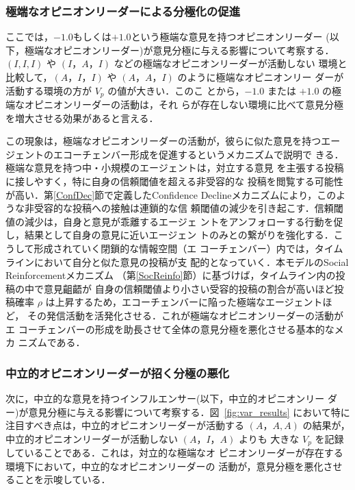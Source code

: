 \documentclass[a4j]{ujarticle}
\def\post{\rho} %
\def\postOpVar{V_p}
\begin{document}
\subsubsection{極端なオピニオンリーダーによる分極化の促進}
ここでは，$-1.0$もしくは$+1.0$という極端な意見を持つオピニオンリーダー
(以下，極端なオピニオンリーダー)が意見分極に与える影響について考察する．
$(I,I,I)$ や $(I，A，I)$ などの極端なオピニオンリーダーが活動しない
環境と比較して，$(A，I，I)$ や $(A，A，I)$ のように極端なオピニオンリー
ダーが活動する環境の方が $\postOpVar$ の値が大きい．このこ
とから，$-1.0$ または $+1.0$ の極端なオピニオンリーダーの活動は，それ
らが存在しない環境に比べて意見分極を増大させる効果があると言える．
\par


この現象は，極端なオピニオンリーダーの活動が，彼らに似た意見を持つエー
ジェントのエコーチェンバー形成を促進するというメカニズムで説明で
きる．極端な意見を持つ中・小規模のエージェントは，対立する意見
を主張する投稿に接しやすく，特に自身の信頼閾値を超える非受容的な
投稿を閲覧する可能性が高い．第\ref{ConfDec}節で定義したConfidence
Declineメカニズムにより，このような非受容的な投稿への接触は連鎖的な信
頼閾値の減少を引き起こす．信頼閾値の減少は，自身と意見が乖離するエージェ
ントをアンフォローする行動を促し，結果として自身の意見に近いエージェン
トのみとの繋がりを強化する．こうして形成されていく閉鎖的な情報空間（エ
  コーチェンバー）内では，タイムラインにおいて自分と似た意見の投稿が支
配的となっていく．本モデルのSocial Reinforcementメカニズム
（第\ref{SocReinfo}節）に基づけば，タイムライン内の投稿の中で意見齟齬が
自身の信頼閾値より小さい受容的投稿の割合が高いほど投稿確率
$\post$ は上昇するため，エコーチェンバーに陥った極端なエージェントほど，
その発信活動を活発化させる．これが極端なオピニオンリーダーの活動がエ
コーチェンバーの形成を助長させて全体の意見分極を悪化させる基本的なメカ
ニズムである．
\par


\subsubsection{中立的オピニオンリーダーが招く分極の悪化}
次に，中立的な意見を持つインフルエンサー(以下，中立的オピニオンリー
ダー)が意見分極に与える影響について考察する．図~\ref{fig:var_results}
において特に注目すべき点は，中立的オピニオンリーダーが活動する $(A，A,
A)$ の結果が，中立的オピニオンリーダーが活動しない $(A，I，A)$ よりも
大きな $\postOpVar$ を記録していることである．これは，対立的な極端なオ
ピニオンリーダーが存在する環境下において，中立的なオピニオンリーダーの
活動が，意見分極を悪化させることを示唆している．
\par
\end{document}
